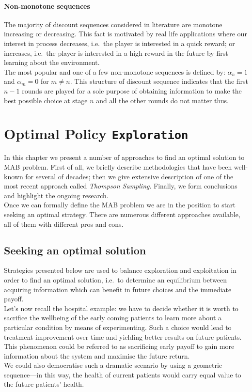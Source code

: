 \documentclass[12pt, a4paper, pdflatex, leqno, twoside]{report}
\begin{document}
\subsubsection{Non-monotone sequences\label{sec:nonmonotone}}
The majority of discount sequences considered in literature are monotone increasing 
or decreasing. This fact is motivated by real life applications where our 
interest in process decreases, i.e.\ the player is interested in a quick reward; or 
increases, i.e.\ the player is interested in a high reward in the future by first 
learning about the environment.\\
The most popular and one of a few non-monotone sequences is defined by: 
$\alpha_n = 1$ and $\alpha_m = 0$ for $m \neq n$. This structure of discount 
sequence indicates that the first $n-1$ rounds are played for a sole purpose of 
obtaining information to make the best possible choice at stage $n$ and all the 
other rounds do not matter thus.\\



\chapter{Optimal Policy \texttt{\textbf{Exploration}}\label{ch:exploration}}
In this chapter we present a number of approaches to find an optimal 
solution to MAB problem. First of all, we briefly describe methodologies that have been well-known for several of decades; then we give extensive description of one of the most recent approach called \emph{Thompson Sampling}. Finally, we form conclusions and highlight the ongoing research.\\

Once we can formally define the MAB problem we are in the position to start seeking an optimal strategy. There are numerous different approaches available, all of them with different pros and cons.\\

\section{Seeking an optimal solution}
Strategies presented below are used to balance exploration and exploitation in order to 
find an optimal solution, i.e.\ to determine an equilibrium between acquiring information which can benefit in future choices
and the immediate payoff.\\
Let's now recall the hospital example: we have to decide whether it is worth to sacrifice 
the wellbeing of the early coming patients to learn more about a particular condition by means of experimenting. 
Such a choice would lead to treatment improvement over time and 
yielding better results on future patients. This phenomenon could be referred to as sacrificing early payoff 
to gain more information about the system and maximise the future return.\\
We could also democratise such a dramatic scenario by using a geometric sequence---in this way, the health of current patients 
would carry equal value to the future patients' health.\\
\end{document}
